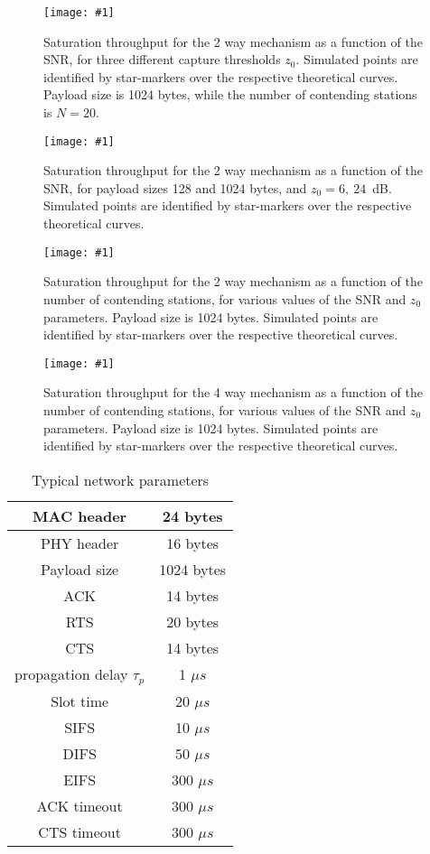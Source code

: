 \documentclass[10pt,onecolumn,a4paper]{IEEEtran}
\newcommand{\figura}[3]
{
\begin{figure}
  \centering
 \texttt{[image: \#1]}
  \caption{#2}\label{#3}
\end{figure}
}
\begin{document}
\clearpage
\figura{2W_1024b_N20.eps}{Saturation throughput for the 2 way
mechanism as a function of the SNR, for three different capture
thresholds $z_0$. Simulated points are identified by star-markers
over the respective theoretical curves. Payload size is 1024
bytes, while the number of contending stations is
$N=20$.}{2W_1024b_N20}
\clearpage
\figura{2W_different_payl_sizes.eps}{Saturation throughput for the
2 way mechanism as a function of the SNR, for payload sizes 128
and 1024 bytes, and $z_0=6,~24$~dB. Simulated points are
identified by star-markers over the respective theoretical
curves.}{2W_different_payl_sizes}
\clearpage
\figura{sim2W_1024byte.eps}{Saturation throughput for the 2 way
mechanism as a function of the number of contending stations, for
various values of the SNR and $z_0$ parameters. Payload size is
1024 bytes. Simulated points are identified by star-markers over
the respective theoretical curves.}{sim2W_1024byte}
\clearpage
\figura{sim4W_1024byte.eps}{Saturation throughput for the 4 way
mechanism as a function of the number of contending stations, for
various values of the SNR and $z_0$ parameters. Payload size is
1024 bytes. Simulated points are identified by star-markers over
the respective theoretical curves.}{sim4W_1024byte}
\clearpage
\begin{table}\caption{Typical network parameters}\begin{center}
\begin{tabular}{|c|c|}\hline
\hline MAC header & 24 bytes\\
\hline PHY header & 16 bytes\\
\hline Payload size & 1024 bytes\\
\hline ACK & 14 bytes\\
\hline RTS & 20 bytes\\
\hline CTS & 14 bytes\\
\hline
\hline propagation delay $\tau_p$ & 1 $\mu s$\\
\hline Slot time & 20 $\mu s$\\
\hline SIFS & 10 $\mu s$\\
\hline DIFS & 50 $\mu s$\\
\hline EIFS & 300 $\mu s$\\

\hline ACK timeout & 300 $\mu s$\\
\hline CTS timeout & 300 $\mu s$\\
\hline\hline
\end{tabular}
 \label{tab.design.times}
\end{center}
\end{table}
\end{document}

